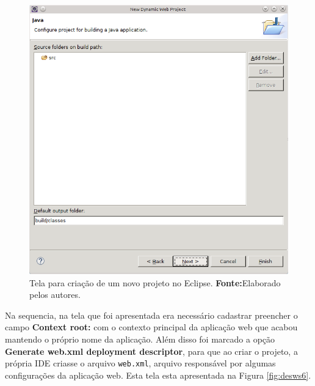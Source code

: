 	\begin{figure}[h!]
		\centerline{\includegraphics[scale=0.8]{./imagens/2_q_metodologico/4_procedimentos_resultados/43_webservice/432_desenvolvimento/desws5.png}}
		\caption[Tela para criação de um novo projeto no Eclipse]{Tela para criação de um novo projeto no Eclipse.
			\textbf{Fonte:}Elaborado pelos autores.}
		\label{fig:desws5}
	\end{figure}
	
	\pagebreak
	
	\par Na sequencia, na tela que foi apresentada era necessário cadastrar
preencher o campo \textbf{Context root:} com o contexto principal da aplicação
web que acabou mantendo o próprio nome da aplicação. Além disso foi marcado a
opção \textbf{Generate web.xml deployment descriptor}, para que ao criar o
projeto, a própria IDE criasse o arquivo \texttt{web.xml}, arquivo responsável
por algumas configurações da aplicação web. Esta tela esta apresentada na
Figura \ref{fig:desws6}.

